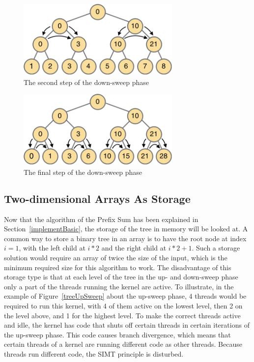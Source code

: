 \documentclass[a4paper]{article}
\begin{document}
\begin{figure}[htb!]
	\centering
	\includegraphics[width=80mm]{../images/tree-downsweep-second.png}
	\caption{The second step of the down-sweep phase}
	\label{treeDownSweepSecond}
\end{figure}

\begin{figure}[htb!]
	\centering
	\includegraphics[width=80mm]{../images/tree-downsweep-final.png}
	\caption{The final step of the down-sweep phase}
	\label{treeDownSweepFinal}
\end{figure}
\FloatBarrier

\subsection{Two-dimensional Arrays As Storage} \label{prefixSumStorage}
Now that the algorithm of the Prefix Sum has been explained in Section~\ref{implementBasic}, the storage of the tree in memory will be looked at. A common way to store a binary tree in an array is to have the root node at index $i=1$, with the left child at $i*2$ and the right child at $i*2+1$. Such a storage solution would require an array of twice the size of the input, which is the minimum required size for this algorithm to work. The disadvantage of this storage type is that at each level of the tree in the up- and down-sweep phase only a part of the threads running the kernel are active. To illustrate, in the example of Figure~\ref{treeUpSweep} about the up-sweep phase, 4 threads would be required to run this kernel, with 4 of them active on the lowest level, then 2 on the level above, and 1 for the highest level. To make the correct threads active and idle, the kernel has code that shuts off certain threads in certain iterations of the up-sweep phase. This code causes branch divergence, which means that certain threads of a kernel are running different code as other threads. Because threads run different code, the SIMT principle is disturbed.
\end{document}
